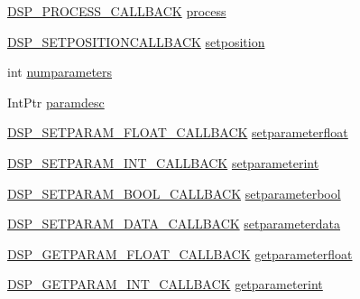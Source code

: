 \begin{DoxyCompactItemize}
\item 
\hyperlink{namespace_f_m_o_d_a0dc8b7058b8085af4c8a354b9313163d}{D\+S\+P\+\_\+\+P\+R\+O\+C\+E\+S\+S\+\_\+\+C\+A\+L\+L\+B\+A\+CK} \hyperlink{struct_f_m_o_d_1_1_d_s_p___d_e_s_c_r_i_p_t_i_o_n_ac9d586cd1daf54115d398c18bbfef157}{process}
\item 
\hyperlink{namespace_f_m_o_d_a6dbd1188198e03257a7e8b7b7275a882}{D\+S\+P\+\_\+\+S\+E\+T\+P\+O\+S\+I\+T\+I\+O\+N\+C\+A\+L\+L\+B\+A\+CK} \hyperlink{struct_f_m_o_d_1_1_d_s_p___d_e_s_c_r_i_p_t_i_o_n_a3fca18108efb4f1cd7466879d4601916}{setposition}
\item 
int \hyperlink{struct_f_m_o_d_1_1_d_s_p___d_e_s_c_r_i_p_t_i_o_n_a7f297a4f7f59b0ad439db3490713344b}{numparameters}
\item 
Int\+Ptr \hyperlink{struct_f_m_o_d_1_1_d_s_p___d_e_s_c_r_i_p_t_i_o_n_aa3d0baccf5137e616b8c427d84669819}{paramdesc}
\item 
\hyperlink{namespace_f_m_o_d_a9bed3a515f9c85842fd2e3667ee82d7f}{D\+S\+P\+\_\+\+S\+E\+T\+P\+A\+R\+A\+M\+\_\+\+F\+L\+O\+A\+T\+\_\+\+C\+A\+L\+L\+B\+A\+CK} \hyperlink{struct_f_m_o_d_1_1_d_s_p___d_e_s_c_r_i_p_t_i_o_n_a88e198bf667ac35cc496904ac36168ef}{setparameterfloat}
\item 
\hyperlink{namespace_f_m_o_d_ac198fafe4f8f8a3c34870daa4d5d64e6}{D\+S\+P\+\_\+\+S\+E\+T\+P\+A\+R\+A\+M\+\_\+\+I\+N\+T\+\_\+\+C\+A\+L\+L\+B\+A\+CK} \hyperlink{struct_f_m_o_d_1_1_d_s_p___d_e_s_c_r_i_p_t_i_o_n_af90c0de1b7bf1e80a4d8d5655d8e92ab}{setparameterint}
\item 
\hyperlink{namespace_f_m_o_d_a1c87fb972d6140c479b23f30c459b3f0}{D\+S\+P\+\_\+\+S\+E\+T\+P\+A\+R\+A\+M\+\_\+\+B\+O\+O\+L\+\_\+\+C\+A\+L\+L\+B\+A\+CK} \hyperlink{struct_f_m_o_d_1_1_d_s_p___d_e_s_c_r_i_p_t_i_o_n_abffe94dc5f34f9e5171f02ac68360031}{setparameterbool}
\item 
\hyperlink{namespace_f_m_o_d_ae45105ca8a1ef96972de8df39686dd37}{D\+S\+P\+\_\+\+S\+E\+T\+P\+A\+R\+A\+M\+\_\+\+D\+A\+T\+A\+\_\+\+C\+A\+L\+L\+B\+A\+CK} \hyperlink{struct_f_m_o_d_1_1_d_s_p___d_e_s_c_r_i_p_t_i_o_n_a47c1cfdc25ac92d8b8204a98b176d761}{setparameterdata}
\item 
\hyperlink{namespace_f_m_o_d_a4130b86a5e4abbffff836107fab70e65}{D\+S\+P\+\_\+\+G\+E\+T\+P\+A\+R\+A\+M\+\_\+\+F\+L\+O\+A\+T\+\_\+\+C\+A\+L\+L\+B\+A\+CK} \hyperlink{struct_f_m_o_d_1_1_d_s_p___d_e_s_c_r_i_p_t_i_o_n_aa5a8c14acab66247ab59699b2f8f1687}{getparameterfloat}
\item 
\hyperlink{namespace_f_m_o_d_a9dd6fc9cca0cf8aa18cd9a631f901247}{D\+S\+P\+\_\+\+G\+E\+T\+P\+A\+R\+A\+M\+\_\+\+I\+N\+T\+\_\+\+C\+A\+L\+L\+B\+A\+CK} \hyperlink{struct_f_m_o_d_1_1_d_s_p___d_e_s_c_r_i_p_t_i_o_n_a41c255d7faaf0605d4c50e8a7e31b18d}{getparameterint}

\end{DoxyCompactItemize}
